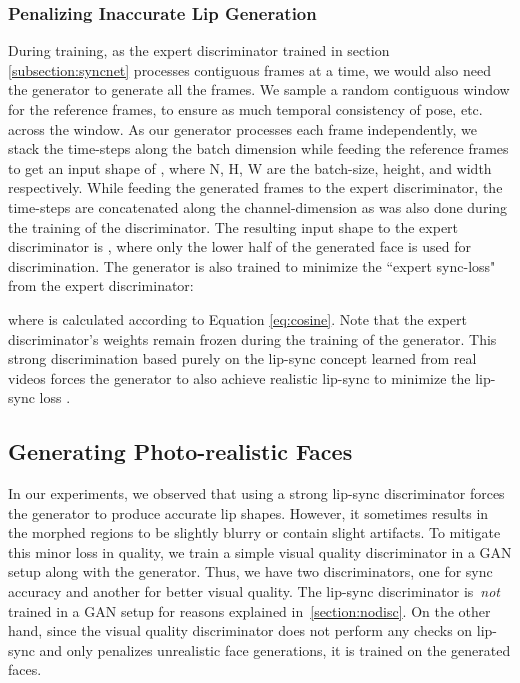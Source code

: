 \documentclass[sigconf]{acmart}
\begin{document}
\subsubsection{Penalizing Inaccurate Lip Generation}
During training, as the expert discriminator trained in section \ref{subsection:syncnet} processes  contiguous frames at a time, we would also need the generator  to generate all the  frames. We sample a random contiguous window for the reference frames, to ensure as much temporal consistency of pose, etc. across the  window. As our generator processes each frame independently, we stack the time-steps along the batch dimension while feeding the reference frames to get an input shape of , where N, H, W are the batch-size, height, and width respectively. While feeding the generated frames to the expert discriminator, the time-steps are concatenated along the channel-dimension as was also done during the training of the discriminator. The resulting input shape to the expert discriminator is , where only the lower half of the generated face is used for discrimination. The generator is also trained to minimize the ``expert sync-loss"  from the expert discriminator:



where  is calculated according to Equation \ref{eq:cosine}. Note that the expert discriminator's weights remain frozen during the training of the generator. This strong discrimination based purely on the lip-sync concept learned from real videos forces the generator to also achieve realistic lip-sync to minimize the lip-sync loss . 

\subsection{Generating Photo-realistic Faces}
In our experiments, we observed that using a strong lip-sync discriminator forces the generator to produce accurate lip shapes. However, it sometimes results in the morphed regions to be slightly blurry or contain slight artifacts. To mitigate this minor loss in quality, we train a simple visual quality discriminator in a GAN setup along with the generator. Thus, we have two discriminators, one for sync accuracy and another for better visual quality. The lip-sync discriminator is~\textit{not} trained in a GAN setup for reasons explained in~\ref{section:nodisc}. On the other hand, since the visual quality discriminator does not perform any checks on lip-sync and only penalizes unrealistic face generations, it is trained on the generated faces. 
\end{document}
